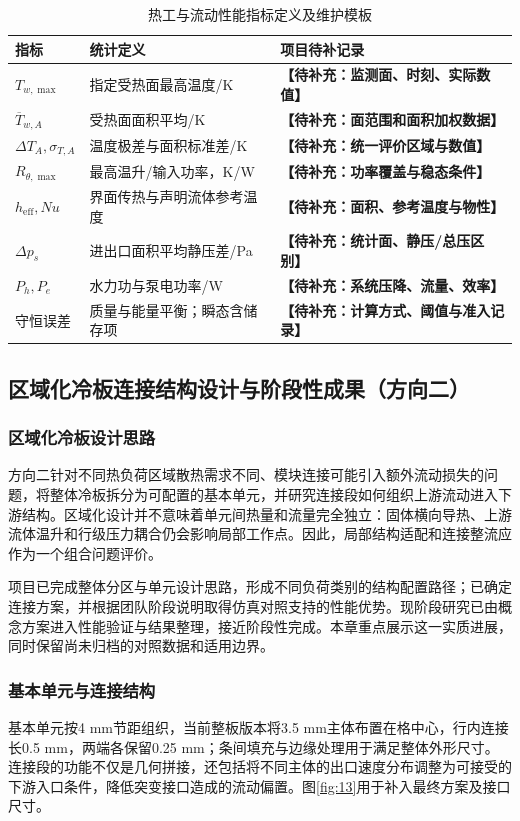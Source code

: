 \documentclass[stage2,UTF8,fontset=fandol]{ydzjreport}
\DeclareRobustCommand{\TBD}[1]{{\color{ydzjgrey}\textbf{【待补充：#1】}}}
\begin{document}
\begin{table}[htbp]
\centering\small
\caption{热工与流动性能指标定义及维护模板}\label{tab:06}
\begin{tabularx}{\linewidth}{lYY}
\toprule
{} 指标 & 统计定义 & 项目待补记录 \\
\midrule
$T_{w,\max}$ & 指定受热面最高温度/K & \TBD{监测面、时刻、实际数值} \\
$\overline T_{w,A}$ & 受热面面积平均/K & \TBD{面范围和面积加权数据} \\
$\Delta T_A,\sigma_{T,A}$ & 温度极差与面积标准差/K & \TBD{统一评价区域与数值} \\
$R_{\theta,\max}$ & 最高温升/输入功率，K/W & \TBD{功率覆盖与稳态条件} \\
$h_{\mathrm{eff}},Nu$ & 界面传热与声明流体参考温度 & \TBD{面积、参考温度与物性} \\
$\Delta p_s$ & 进出口面积平均静压差/Pa & \TBD{统计面、静压/总压区别} \\
$P_h,P_e$ & 水力功与泵电功率/W & \TBD{系统压降、流量、效率} \\
守恒误差 & 质量与能量平衡；瞬态含储存项 & \TBD{计算方式、阈值与准入记录} \\
\bottomrule
\end{tabularx}
\end{table}

\subsection{区域化冷板连接结构设计与阶段性成果（方向二）}
\label{ch:connection}
\subsubsection{区域化冷板设计思路}
方向二针对不同热负荷区域散热需求不同、模块连接可能引入额外流动损失的问题，将整体冷板拆分为可配置的基本单元，并研究连接段如何组织上游流动进入下游结构。区域化设计并不意味着单元间热量和流量完全独立：固体横向导热、上游流体温升和行级压力耦合仍会影响局部工作点。因此，局部结构适配和连接整流应作为一个组合问题评价。

项目已完成整体分区与单元设计思路，形成不同负荷类别的结构配置路径；已确定连接方案，并根据团队阶段说明取得仿真对照支持的性能优势。现阶段研究已由概念方案进入性能验证与结果整理，接近阶段性完成。本章重点展示这一实质进展，同时保留尚未归档的对照数据和适用边界。

\subsubsection{基本单元与连接结构}
基本单元按4 mm节距组织，当前整板版本将3.5 mm主体布置在格中心，行内连接长0.5 mm，两端各保留0.25 mm；条间填充与边缘处理用于满足整体外形尺寸。连接段的功能不仅是几何拼接，还包括将不同主体的出口速度分布调整为可接受的下游入口条件，降低突变接口造成的流动偏置。图\ref{fig:13}用于补入最终方案及接口尺寸。
\end{document}

